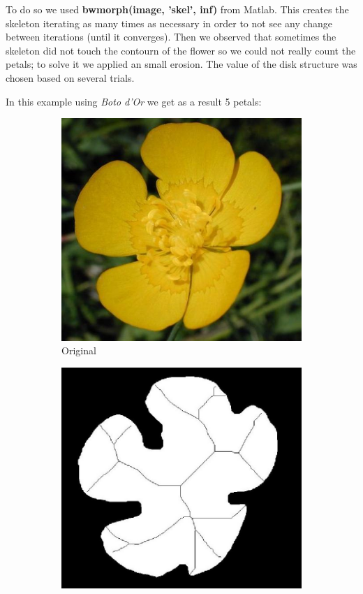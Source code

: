 \documentclass[11]{article}
\begin{document}
To do so we used \textbf{bwmorph(image, 'skel', inf)} from Matlab. This	 creates the skeleton iterating as many times as necessary in order to not see any change between iterations (until it converges). Then we observed that sometimes the skeleton did not touch the contourn of the flower so we could not really count the petals; to solve it we applied an small erosion. The value of the disk structure was chosen based on several trials. 
\medskip

\noindent In this example using \textit{Boto d'Or} we get as a result 5 petals:
\begin{figure}[H]
    \begin{subfigure}[t]{.49\linewidth}
    \centering
  \includegraphics[scale=0.25]{images/numberOfPetalsOriginal.jpg}
  \caption{Original}
  \label{original}
    \end{subfigure}
    \begin{subfigure}[t]{.49\linewidth}
    \centering
    \includegraphics[scale=0.2]{images/numberOfPetals.jpg}

\end{subfigure}
\end{figure}
\end{document}
